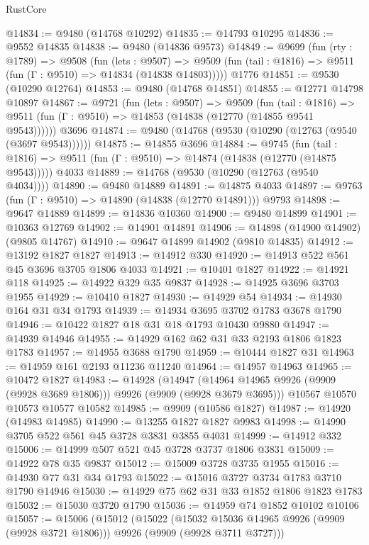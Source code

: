 \begin{lexlean}{RustCore}
\begin{coremodule}
@14834 := @9480 (@14768 @10292)
@14835 := @14793 @10295
@14836 := @9552 @14835
@14838 := @9480 (@14836 @9573)
@14849 := @9699
    (fun (rty : @1789) =>
    @9508
      (fun (lets : @9507) =>
      @9509 (fun (tail : @1816) => @9511 (fun (Γ : @9510) => @14834 (@14838 @14803)))))
    @1776
@14851 := @9530 (@10290 @12764)
@14853 := @9480 (@14768 @14851)
@14855 := @12771 @14798 @10897
@14867 := @9721
    (fun (lets : @9507) =>
    @9509
      (fun (tail : @1816) =>
      @9511 (fun (Γ : @9510) => @14853 (@14838 (@12770 (@14855 @9541 @9543))))))
    @3696
@14874 := @9480 (@14768 (@9530 (@10290 (@12763 (@9540 (@3697 @9543))))))
@14875 := @14855 @3696
@14884 := @9745
    (fun (tail : @1816) => @9511 (fun (Γ : @9510) => @14874 (@14838 (@12770 (@14875 @9543)))))
    @4033
@14889 := @14768 (@9530 (@10290 (@12763 (@9540 @4034))))
@14890 := @9480 @14889
@14891 := @14875 @4033
@14897 := @9763 (fun (Γ : @9510) => @14890 (@14838 (@12770 @14891))) @9793
@14898 := @9647 @14889
@14899 := @14836 @10360
@14900 := @9480 @14899
@14901 := @10363 @12769
@14902 := @14901 @14891
@14906 := @14898 (@14900 @14902) (@9805 @14767)
@14910 := @9647 @14899 @14902 (@9810 @14835)
@14912 := @13192 @1827 @1827
@14913 := @14912 @330
@14920 := @14913 @522 @561 @45 @3696 @3705 @1806 @4033
@14921 := @10401 @1827
@14922 := @14921 @118
@14925 := @14922 @329 @35 @9837
@14928 := @14925 @3696 @3703 @1955
@14929 := @10410 @1827
@14930 := @14929 @54
@14934 := @14930 @164 @31 @34 @1793
@14939 := @14934 @3695 @3702 @1783 @3678 @1790
@14946 := @10422 @1827 @18 @31 @18 @1793 @10430 @9880
@14947 := @14939 @14946
@14955 := @14929 @162 @62 @31 @33 @2193 @1806 @1823 @1783
@14957 := @14955 @3688 @1790
@14959 := @10444 @1827 @31
@14963 := @14959 @161 @2193 @11236 @11240
@14964 := @14957 @14963
@14965 := @10472 @1827
@14983 := @14928
    (@14947 (@14964 @14965 @9926 (@9909 (@9928 @3689 @1806))) @9926 (@9909 (@9928 @3679 @3695)))
    @10567
    @10570
    @10573
    @10577
    @10582
@14985 := @9909 (@10586 @1827)
@14987 := @14920 (@14983 @14985)
@14990 := @13255 @1827 @1827 @9983
@14998 := @14990 @3705 @522 @561 @45 @3728 @3831 @3855 @4031
@14999 := @14912 @332
@15006 := @14999 @507 @521 @45 @3728 @3737 @1806 @3831
@15009 := @14922 @78 @35 @9837
@15012 := @15009 @3728 @3735 @1955
@15016 := @14930 @77 @31 @34 @1793
@15022 := @15016 @3727 @3734 @1783 @3710 @1790 @14946
@15030 := @14929 @75 @62 @31 @33 @1852 @1806 @1823 @1783
@15032 := @15030 @3720 @1790
@15036 := @14959 @74 @1852 @10102 @10106
@15057 := @15006
    (@15012
      (@15022
        (@15032 @15036 @14965 @9926 (@9909 (@9928 @3721 @1806)))
        @9926
        (@9909 (@9928 @3711 @3727)))

\end{coremodule}
\end{lexlean}
